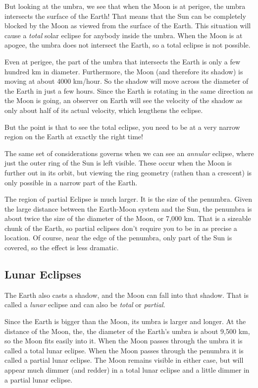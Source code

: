 \documentclass[12pt, preprint]{aastex}
\begin{document}
But looking at the umbra, we see that when the Moon is at perigee, the
umbra intersects the surface of the Earth! That means that the Sun can
be completely blocked by the Moon as viewed from the surface of the
Earth. This situation will cause a {\it total} solar eclipse for
anybody inside the umbra. When the Moon is at apogee, the umbra does
not intersect the Earth, so a total eclipse is not possible.

Even at perigee, the part of the umbra that intersects the Earth is
only a few hundred km in diameter. Furthermore, the Moon (and
therefore its shadow) is moving at about 4000 km/hour. So the shadow
will move across the diameter of the Earth in just a few hours. Since
the Earth is rotating in the same direction as the Moon is going, an
observer on Earth will see the velocity of the shadow as only about
half of its actual velocity, which lengthens the eclipse.

But the point is that to see the total eclipse, you need to be at a
very narrow region on the Earth at exactly the right time!

The same set of considerations governs when we can see an {\it
  annular} eclipse, where just the outer ring of the Sun is left
visible. These occur when the Moon is further out in its orbit, but
viewing the ring geometry (rathen than a crescent) is only possible in
a narrow part of the Earth.

The region of partial Eclipse is much larger. It is the size of the
penumbra. Given the large distance between the Earth-Moon system and
the Sun, the penumbra is about twice the size of the diameter of the
Moon, or 7,000 km. That is a sizeable chunk of the Earth, so partial
eclipses don't require you to be in as precise a location. Of course,
near the edge of the penumbra, only part of the Sun is covered, so the
effect is less dramatic.

\subsection{Lunar Eclipses}

The Earth also casts a shadow, and the Moon can fall into that
shadow. That is called a {\it lunar} eclipse and can also be {\it
  total} or {\it partial}. 

Since the Earth is bigger than the Moon, its umbra is larger and
longer. At the distance of the Moon, the, the diameter of the Earth's
umbra is about 9,500 km, so the Moon fits easily into it. When the
Moon passes through the umbra it is called a total lunar eclipse.
When the Moon passes through the penumbra it is called a partial lunar
eclipse. The Moon remains visible in either case, but will appear much
dimmer (and redder) in a total lunar eclipse and a little dimmer in a
partial lunar eclipse.
\end{document}

